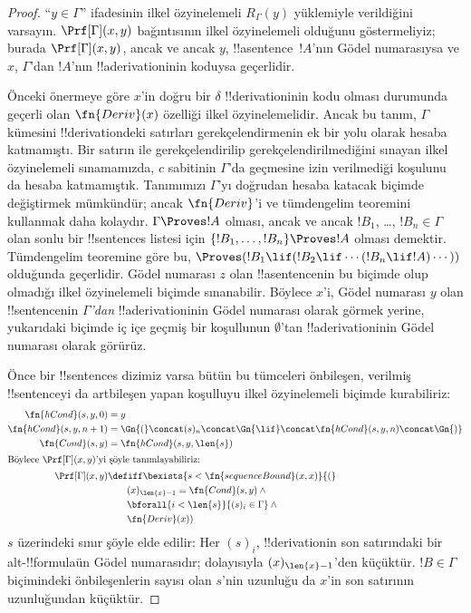 \documentclass[../../../include/open-logic-section]{subfiles}
\begin{document}
\begin{proof}
``$y \in \Gamma$'' ifadesinin ilkel özyinelemeli $R_\Gamma(y)$ yüklemiyle
verildiğini varsayın. $\Prf[\Gamma](x,y)$ bağıntısının ilkel özyinelemeli
olduğunu göstermeliyiz; burada $\Prf[\Gamma](x,y)$, ancak ve ancak $y$,
!!a{sentence}~$!A$'nın Gödel numarasıysa ve $x$, $\Gamma$'dan $!A$'nın
!!a{derivation}{}inin koduysa geçerlidir.

Önceki önermeye göre $x$'in doğru bir $\delta$ !!{derivation}{}inin kodu olması
durumunda geçerli olan $\fn{Deriv}(x)$ özelliği ilkel özyinelemelidir. Ancak
bu tanım, $\Gamma$ kümesini !!{derivation}{}deki satırları gerekçelendirmenin
ek bir yolu olarak hesaba katmamıştı. Bir satırın \QR{} ile gerekçelendirilip
gerekçelendirilmediğini sınayan ilkel özyinelemeli sınamamızda, $c$ sabitinin
$\Gamma$'da geçmesine izin verilmediği koşulunu da hesaba katmamıştık.
Tanımımızı $\Gamma$'yı doğrudan hesaba katacak biçimde değiştirmek mümkündür;
ancak $\fn{Deriv}$'i ve tümdengelim teoremini kullanmak daha kolaydır.
$\Gamma \Proves !A$ olması, ancak ve ancak $!B_1$, \dots, $!B_n \in
\Gamma$ olan sonlu bir !!{sentence}s listesi için
$\{!B_1, \dots, !B_n\} \Proves !A$ olması demektir. Tümdengelim teoremine
göre bu, $\Proves (!B_1 \lif (!B_2 \lif
\cdots (!B_n \lif !A)\cdots))$ olduğunda geçerlidir. Gödel numarası $z$ olan
!!a{sentence}{}nin bu biçimde olup olmadığı ilkel özyinelemeli biçimde
sınanabilir. Böylece $x$'i, Gödel numarası $y$ olan !!{sentence}{}nin
\emph{$\Gamma$'dan} !!a{derivation}{}inin Gödel numarası olarak görmek yerine,
yukarıdaki biçimde iç içe geçmiş bir koşullunun $\emptyset$'tan
!!a{derivation}{}inin Gödel numarası olarak görürüz.

Önce bir !!{sentence}s dizimiz varsa bütün bu tümceleri önbileşen, verilmiş
!!{sentence}{}yi da artbileşen yapan koşulluyu ilkel özyinelemeli biçimde
kurabiliriz:
\begin{align*}
  \fn{hCond}(s, y, 0) & = y \\
  \fn{hCond}(s, y, n+1) & = \Gn{(} \concat (s)_{n} \concat \Gn{\lif}
  \concat \fn{hCond}(s, y, n) \concat \Gn{)}\\
  \fn{Cond}(s, y) & = \fn{hCond}(s, y, \len{s})\\
  \intertext{Böylece $\Prf[\Gamma](x, y)$'yi şöyle tanımlayabiliriz:}
  \Prf[\Gamma](x, y) & \defiff \bexists{s < \fn{sequenceBound}(x,x)}{(} \\
  &\qquad (x)_{\len{x}-1} = \fn{Cond}(s,y) \land {} \\
  &\qquad\bforall{i<\len{s}}{(s)_i \in \Gamma} \land {} \\
  &\qquad\fn{Deriv}(x))
\end{align*}
$s$ üzerindeki sınır şöyle elde edilir: Her $(s)_i$, !!{derivation}{}in son
satırındaki bir alt-!!{formula}{}ün Gödel numarasıdır; dolayısıyla
$(x)_{\len{x}-1}$'den küçüktür. $!B \in \Gamma$ biçimindeki önbileşenlerin
sayısı olan $s$'nin uzunluğu da $x$'in son satırının uzunluğundan
küçüktür.
\end{proof}
\end{document}
